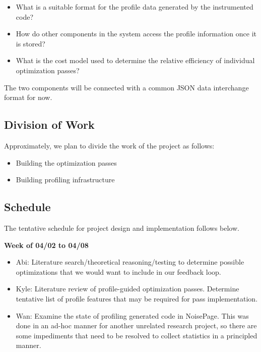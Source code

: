 \documentclass{vldb}
\begin{document}
\begin{itemize}
    \item What is a suitable format for the profile data generated by the instrumented code?
    \item How do other components in the system access the profile information once it is stored?
    \item What is the cost model used to determine the relative efficiency of individual optimization passes?
\end{itemize}

The two components will be connected with a common JSON data interchange format for now.

\subsection{Division of Work}

Approximately, we plan to divide the work of the project as follows:

\begin{itemize}
    \item Building the optimization passes
    \item Building profiling infrastructure
\end{itemize}

\subsection{Schedule}

The tentative schedule for project design and implementation follows below.

\textbf{Week of 04/02 to 04/08}
\begin{itemize}
    \item Abi: Literature search/theoretical reasoning/testing to determine possible optimizations that we would want to include in our feedback loop. 
    \item Kyle: Literature review of profile-guided optimization passes. Determine tentative list of profile features that may be required for pass implementation.
    \item Wan: Examine the state of profiling generated code in NoisePage. This was done in an ad-hoc manner for another unrelated research project, so there are some impediments that need to be resolved to collect statistics in a principled manner.
\end{itemize}
\end{document}

